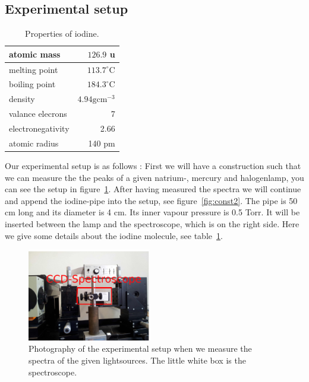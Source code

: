 \subsection{Experimental setup}
\begin{table}
\caption{Properties of iodine.}
\begin{tabular}{| l | r |}
    \hline
    atomic mass   & $126.9$ u \\
    \hline
    melting point & $113.7^{\circ}$C \\
    \hline
    boiling point & $184.3^{\circ}$C \\ 
    \hline
    density & $4.94 \text{gcm}^{-3} $ \\
    \hline
    valance elecrons & 7 \\
    \hline
    electronegativity & 2.66 \\
    \hline
    atomic radius & 140 pm \\
    \hline
\end{tabular}
\label{tab:iodine}
\end{table}


Our experimental setup is as follows \cite{versuchsanleitung}:
First we will have a construction such that we can measure the 
the peaks of a given natrium-, mercury and halogenlamp, you 
can see the setup in figure~\ref{fig:const1}.
After having measured the spectra we will continue and append
the iodine-pipe into the setup, see figure~\ref{fig:const2}.
The pipe is 50 cm long and its diameter is 4 cm. Its inner 
vapour pressure is 0.5 Torr. It will be 
inserted between the lamp and the spectroscope, which is on 
the right side. Here we give some details \cite{weisstein} 
about the iodine molecule, see table~\ref{tab:iodine}.

\begin{figure}
  \begin{center}
    \includegraphics[width=0.48\textwidth]{pics/const1}
  \end{center}
\caption{Photography of the experimental setup when we measure
    the spectra of the given lightsources. The little white box is
    the spectroscope.} 
 \label{fig:const1}

\end{figure}
